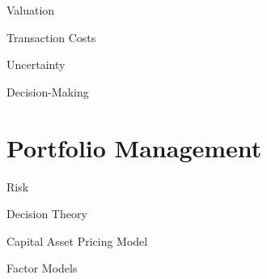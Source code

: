 \documentclass{beamer}
\begin{document}
\begin{frame}{Valuation}
\end{frame}

\begin{frame}{Transaction Costs}


\end{frame}

\begin{frame}{Uncertainty}
\end{frame}

\begin{frame}{Decision-Making}
\end{frame}

\section{Portfolio Management}
\begin{frame}{Risk}
\end{frame}

\begin{frame}{Decision Theory}
\end{frame}

\begin{frame}{Capital Asset Pricing Model}
\end{frame}

\begin{frame}{Factor Models}
\end{frame}
\end{document}
